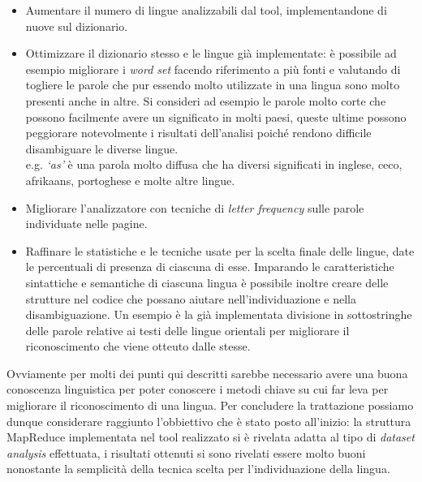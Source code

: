 \documentclass{article}
\newcommand{\MR}{MapReduce}
\begin{document}
\begin{itemize}
    \item Aumentare il numero di lingue analizzabili dal tool, implementandone di nuove sul dizionario.
    \item Ottimizzare il dizionario stesso e le lingue già implementate: è possibile ad esempio migliorare i \textit{word set} facendo riferimento a più fonti e valutando di togliere le parole che pur essendo molto utilizzate in una lingua sono molto presenti anche in altre. Si consideri ad esempio le parole molto corte che possono facilmente avere un significato in molti paesi, queste ultime possono peggiorare notevolmente i risultati dell'analisi poiché rendono difficile disambiguare le diverse lingue.\\
    e.g. \textit{`as'} è una parola molto diffusa che ha diversi significati in inglese, ceco, afrikaans, portoghese e molte altre lingue.
    \item Migliorare l'analizzatore con tecniche di \textit{letter frequency} sulle parole individuate nelle pagine.
    \item Raffinare le statistiche e le tecniche usate per la scelta finale delle lingue, date le percentuali di presenza di ciascuna di esse. Imparando le caratteristiche sintattiche e semantiche di ciascuna lingua è possibile inoltre creare delle strutture nel codice che possano aiutare nell'individuazione e nella disambiguazione. Un esempio è la già implementata divisione in sottostringhe delle parole relative ai testi delle lingue orientali per migliorare il riconoscimento che viene otteuto dalle stesse.
\end{itemize}
Ovviamente per molti dei punti qui descritti sarebbe necessario avere una buona conoscenza linguistica per poter conoscere i metodi chiave su cui far leva per migliorare il riconoscimento di una lingua. Per concludere la trattazione possiamo dunque considerare raggiunto l'obbiettivo che è stato posto all'inizio: la struttura \MR{} implementata nel tool realizzato si è rivelata adatta al tipo di \textit{dataset analysis} effettuata, i risultati ottenuti si sono rivelati essere molto buoni nonostante la semplicità della tecnica scelta per l'individuazione della lingua.   

\newpage




\nocite{crawler}
\nocite{iso639}
\end{document}
